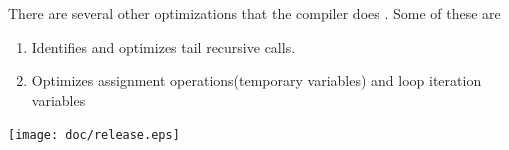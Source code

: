 \documentclass[a4paper,11pt]{report}
\begin{document}
There are several other optimizations that the compiler does . Some of these are
\begin{enumerate}
  \item 
Identifies and optimizes tail recursive calls. 
 \item
Optimizes assignment operations(temporary variables) and loop iteration variables 
\end{enumerate}
\texttt{[image: doc/release.eps]} \\

\nocite{*}

{}
\end{document}
